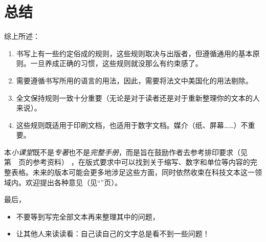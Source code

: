 \chapter{总结}

综上所述：

\begin{enumerate}
    \item 书写上有一些约定俗成的规则，这些规则取决与出版者，但遵循通用的基本原则。一旦养成正确的习惯，这些规则就没那么有约束感了。
    \item 需要遵循书写所用的语言的用法，因此，需要将法文中美国化的用法剔除。
    \item 全文保持规则一致十分重要（无论是对于读者还是对于重新整理你的文本的人来说）。
    \item 这些规则既适用于印刷文档，也适用于数字文档。媒介（纸、屏幕……\nolinebreak）不重要。
\end{enumerate}

本\emph{小课堂}既不是\emph{专著}也不是\emph{完整手册}，而是旨在鼓励作者去参考排印要求（见第~\pageref{chap8}~页的参考资料）
，在版式要求中可以找到关于缩写、数字和单位等内容的完整表格。未来的版本可能会更多地涉足这些方面，同时依然收束在科技文本这一领域内。欢迎提出各种意见（见``''页）。

最后，
\begin{itemize}
    \item 不要等到写完全部文本再来整理其中的问题，
    \item 让其他人来读读看：自己读自己的文字总是看不到一些问题！
\end{itemize}